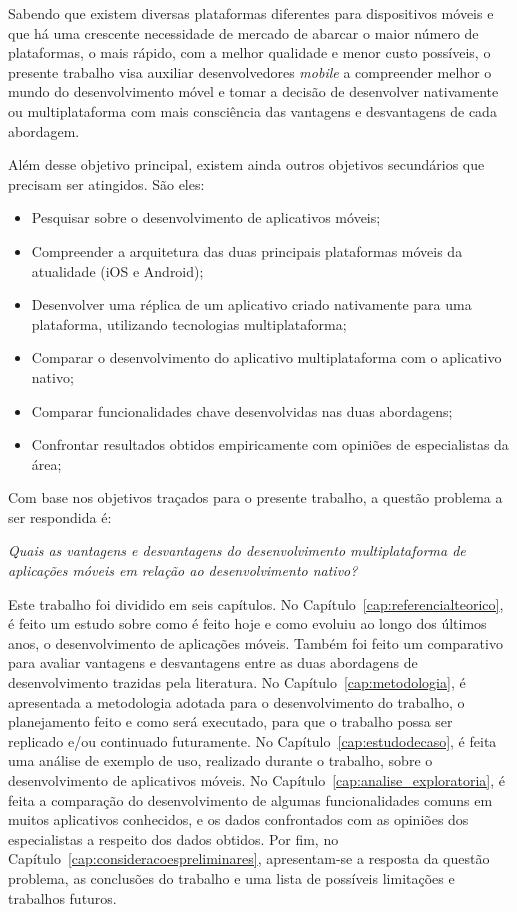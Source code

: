 Sabendo que existem diversas plataformas diferentes para dispositivos móveis e que há uma crescente necessidade de mercado de abarcar o maior número de plataformas, o mais rápido, com a
melhor qualidade e menor custo possíveis, o presente trabalho visa auxiliar desenvolvedores \textit{mobile} a compreender melhor o mundo do desenvolvimento móvel e tomar a decisão de 
desenvolver nativamente ou multiplataforma com mais consciência das vantagens e desvantagens de cada abordagem.

Além desse objetivo principal, existem ainda outros objetivos secundários que precisam ser atingidos. São eles: 
\begin{itemize}
    \item Pesquisar sobre o desenvolvimento de aplicativos móveis;
    \item Compreender a arquitetura das duas principais plataformas móveis da atualidade (iOS e Android);
    \item Desenvolver uma réplica de um aplicativo criado nativamente para uma plataforma, utilizando tecnologias multiplataforma;
    \item Comparar o desenvolvimento do aplicativo multiplataforma com o aplicativo nativo;
    \item Comparar funcionalidades chave desenvolvidas nas duas abordagens;
    \item Confrontar resultados obtidos empiricamente com opiniões de especialistas da área;
\end{itemize}
Com base nos objetivos traçados para o presente trabalho, a questão problema a ser respondida é:
\begin{center}
    \textit{Quais as vantagens e desvantagens do desenvolvimento multiplataforma de aplicações móveis em relação ao desenvolvimento nativo?}
\end{center}

Este trabalho foi dividido em seis capítulos. No Capítulo~\ref{cap:referencialteorico}, é feito um estudo sobre como é feito hoje e como evoluiu ao longo dos últimos anos, o desenvolvimento de aplicações 
móveis. Também foi feito um comparativo para avaliar vantagens e desvantagens entre as duas abordagens de desenvolvimento trazidas pela literatura. No Capítulo~\ref{cap:metodologia}, é apresentada a metodologia adotada 
para o desenvolvimento do trabalho, o planejamento feito e como será executado, para que o trabalho possa ser replicado e/ou continuado futuramente. No Capítulo~\ref{cap:estudodecaso}, é feita uma análise de exemplo de 
uso, realizado durante o trabalho, sobre o desenvolvimento de aplicativos móveis. No Capítulo~\ref{cap:analise_exploratoria}, é feita a comparação do desenvolvimento de algumas funcionalidades comuns em muitos 
aplicativos conhecidos, e os dados confrontados com as opiniões dos especialistas a respeito dos dados obtidos. Por fim, no Capítulo~\ref{cap:consideracoespreliminares}, apresentam-se a resposta da questão problema, 
as conclusões do trabalho e uma lista de possíveis limitações e trabalhos futuros. 
